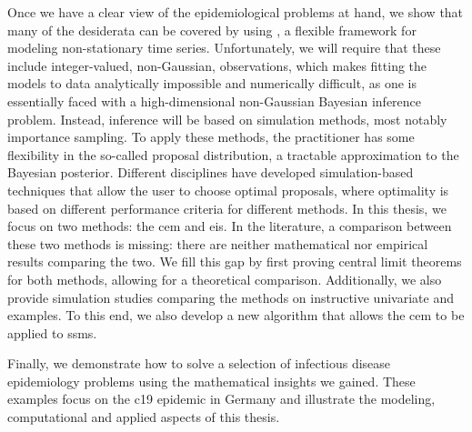 Once we have a clear view of the epidemiological problems at hand, we show that many of the desiderata can be covered by using , a flexible framework for modeling non-stationary time series. Unfortunately, we will require that these  include integer-valued, non-Gaussian, observations, which makes fitting the models to data analytically impossible and numerically difficult, as one is essentially faced with a high-dimensional non-Gaussian Bayesian inference problem. Instead, inference will be based on simulation methods, most notably importance sampling. To apply these methods, the practitioner has some flexibility in the so-called proposal distribution, a tractable approximation to the Bayesian posterior. Different disciplines have developed simulation-based techniques that allow the user to choose optimal proposals, where optimality is based on different performance criteria for different methods. In this thesis, we focus on two methods: the \gls{cem} and \gls{eis}. In the literature, a comparison between these two methods is missing: there are neither mathematical nor empirical results comparing the two. We fill this gap by first proving central limit theorems for both methods, allowing for a theoretical comparison. Additionally, we also provide simulation studies comparing the methods on instructive univariate and  examples. To this end, we also develop a new algorithm that allows the \acrshort{cem} to be applied to \glspl{ssm}. 

Finally, we demonstrate how to solve a selection of infectious disease epidemiology problems using the mathematical insights we gained. These examples focus on the \acrshort{c19} epidemic in Germany and illustrate the modeling, computational and applied aspects of this thesis. 

